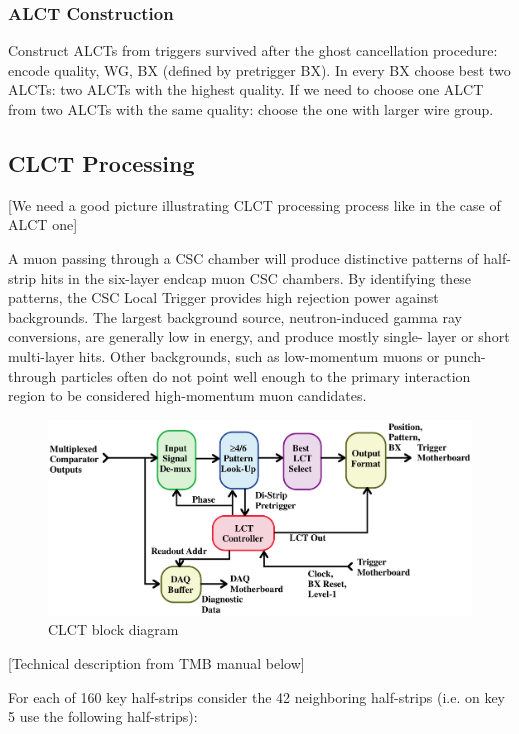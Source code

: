 \subsubsection{ALCT Construction}

Construct ALCTs from triggers survived after the ghost cancellation procedure: encode quality, WG, BX (defined by pretrigger BX). In every BX choose best two ALCTs: two ALCTs with the highest quality. If we need to choose one ALCT from two ALCTs with the same quality: choose the one with larger wire group.

\newpage
\subsection{CLCT Processing}

[We need a good picture illustrating CLCT processing process like in the case of ALCT one]

A muon passing through a CSC chamber will produce distinctive patterns of half-strip
hits in the six-layer endcap muon CSC chambers. By identifying these patterns, the CSC Local
Trigger provides high rejection power against backgrounds. The largest background source,
neutron-induced gamma ray conversions, are generally low in energy, and produce mostly single-
layer or short multi-layer hits. Other backgrounds, such as low-momentum muons or punch-
through particles often do not point well enough to the primary interaction region to be considered
high-momentum muon candidates.

\begin{figure}[tbh]
        \begin{center}
                \includegraphics[width=0.73\linewidth]{figures/CLCT_block_diagram.png}
                \caption{CLCT block diagram}
                \label{fig:clct_block_diagram}
        \end{center}
\end{figure}

[Technical description from TMB manual below]

For each of 160 key half-strips consider the 42 neighboring half-strips (i.e. on key 5 use the following half-strips):

